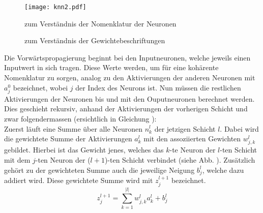 \begin{figure}[h!]
  \centering
  \texttt{[image: knn2.pdf]}
  \caption{zum Verständnis der Nomenklatur der Neuronen}
  \label{fig:nomenklatur1}
\end{figure}
\para{}
\begin{figure}[h!]
  \centering
  \caption{zum Verständnis der Gewichtebeschriftungen}
  \label{fig:nomenklatur2}
\end{figure}
\para{}
Die Vorwärtspropagierung beginnt bei den Inputneuronen, welche jeweils
einen Inputwert in sich tragen. Diese Werte werden, um für eine kohärente Nomenklatur zu sorgen,
analog zu den Aktivierungen der anderen Neuronen mit $a_j^0$ bezeichnet, wobei
$j$ der Index des Neurons ist.
\para{}
Nun müssen die restlichen Aktivierungen der Neuronen bis und mit den
Ouputneuronen berechnet werden. Dies geschieht rekursiv, anhand der
Aktivierungen der vorherigen Schicht und zwar folgendermassen (ersichtlich in
Gleichung ):\\
Zuerst läuft eine Summe über alle Neuronen $n_k^{l}$ der jetzigen Schicht
$l$. Dabei wird die gewichtete Summe der Aktivierungen $a_k^{l}$ mit den
assoziierten Gewichten $w_{j,k}^l$ gebildet. Hierbei ist das Gewicht jenes, welches das
$k$-te Neuron der $l$-ten Schicht mit dem $j$-ten Neuron der ($l+1$)-ten Schicht
verbindet (siehe Abb. ).
Zusätzlich gehört zu der gewichteten Summe auch die jeweilige Neigung $b_j^l$, welche
dazu addiert wird. Diese gewichtete Summe wird mit $z_j^{l+1}$ bezeichnet.
\\
\begin{equation}\tag{FP1}\label{eq:gewichtete_summe_normal}
  z_j^{l+1} = \sum_{k=1}^{|l|} w_{j,k}^l a_k^l + b_j^l
\end{equation}
\\
